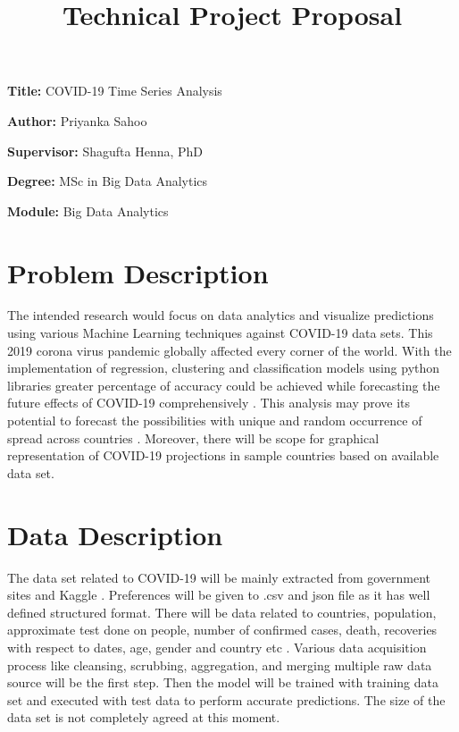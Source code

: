 \documentclass[12pt, a4paper]{article}
\title{Technical Project Proposal}
\author{}
\date{}
\newcommand{\namelistlabel}[1]{\mbox{#1}\hfil}
\newenvironment{namelist}[1]{%
	\begin{list}{}
		{
			\let\makelabel\namelistlabel
			\settowidth{\labelwidth}{#1}
			\setlength{\leftmargin}{1.1\labelwidth}
		}
	}{%
\end{list}}
\begin{document}
	\maketitle
	
	\begin{namelist}{xxxxxxxxxxxx}
		\item[{\bf Title:}]
		COVID-19 Time Series Analysis
		\item[{\bf Author:}]
		Priyanka Sahoo
		\item[{\bf Supervisor:}]
		Shagufta Henna, PhD
		\item[{\bf Degree:}]
		MSc in Big Data Analytics
		\item[{\bf Module:}]
		Big Data Analytics	
	\end{namelist}
	
	\maketitle
	
	\section*{Problem Description}
	The intended research would focus on data analytics and visualize predictions using various Machine Learning techniques against COVID-19 data sets. This 2019 corona virus pandemic globally affected every corner of the world. With the implementation of regression, clustering and classification models using python libraries greater percentage of accuracy could be achieved while forecasting the future effects of COVID-19 comprehensively \cite{worldometers}. This analysis may prove its potential to forecast the possibilities with unique and random occurrence of spread across countries \cite{Time-series}. Moreover, there will be scope for graphical representation of COVID-19 projections in sample countries based on available data set.
	\section*{Data Description}
	The data set related to COVID-19 will be mainly extracted from government sites \cite{Govdata} and Kaggle \cite{kaggle}. Preferences will be given to .csv and json file as it has well defined structured format. There will be data related to countries, population, approximate test done on people, number of confirmed cases, death, recoveries with respect to dates, age, gender and country etc \cite{Trend}. Various data acquisition process like cleansing, scrubbing, aggregation, and merging multiple raw data source will be the first step. Then the model will be trained with training data set and  executed with test data to perform accurate predictions. The size of the data set is not completely agreed at this moment.
	
\end{document}
